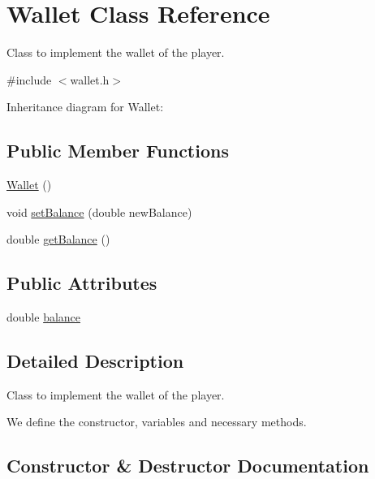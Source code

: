 \hypertarget{classWallet}{}\section{Wallet Class Reference}
\label{classWallet}


Class to implement the wallet of the player.  




{\ttfamily \#include $<$wallet.\+h$>$}



Inheritance diagram for Wallet\+:
\subsection*{Public Member Functions}
\begin{DoxyCompactItemize}
\item 
\hyperlink{classWallet_ad9be9e49244b78db9099fcaeccd1af04}{Wallet} ()
\item 
void \hyperlink{classWallet_a84887f86d53ddf090421365c8ac52661}{set\+Balance} (double new\+Balance)
\item 
double \hyperlink{classWallet_a87b3f7dec77a607a67df9c5d5503b3c6}{get\+Balance} ()
\end{DoxyCompactItemize}
\subsection*{Public Attributes}
\begin{DoxyCompactItemize}
\item 
double \hyperlink{classWallet_acb690105f6e130dac3c0dbd90e842d0a}{balance}
\end{DoxyCompactItemize}


\subsection{Detailed Description}
Class to implement the wallet of the player. 

We define the constructor, variables and necessary methods. 

\subsection{Constructor \& Destructor Documentation}
\mbox{\label{classWallet_ad9be9e49244b78db9099fcaeccd1af04}} 

